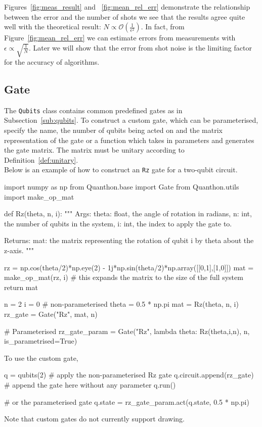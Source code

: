 Figures~\ref{fig:meas_result} and ~\ref{fig:mean_rel_err} demonstrate the relationship between the error and the number of shots we see that the results agree quite well with the theoretical result: $ N \propto \mathcal{O}(\frac{1}{ \epsilon^2 }) $. In fact, from Figure~\ref{fig:mean_rel_err} we can estimate errors from measurements with $ \epsilon \propto \sqrt{\frac{1}{N}} $. Later we will show that the error from shot noise is the limiting factor for the accuracy of algorithms. 


\subsection{Gate}
\label{sub:gate}
The \texttt{Qubits} class contains common predefined gates as in Subsection~\ref{sub:qubits}.
To construct a custom gate, which can be parameterised, specify the name, the number of qubits being acted on and the matrix representation of the gate or a function which takes in parameters and generates the gate matrix. The matrix must be unitary according to Definition~\ref{def:unitary}. \\
Below is an example of how to construct an \texttt{Rz} gate for a two-qubit circuit.
\begin{mycode}
import numpy as np
from Quanthon.base import Gate
from Quanthon.utils import make_op_mat

def Rz(theta, n, i):
	"""
        Args: 
            theta: float, the angle of rotation in radians,
            n: int, the number of qubits in the system,
            i: int, the index to apply the gate to.
        
        Returns:
            mat: the matrix representing the rotation of qubit i by theta about the z-axis.
	"""
    
    rz = np.cos(theta/2)*np.eye(2) - 1j*np.sin(theta/2)*np.array([[0,1],[1,0]])
    mat = make_op_mat(rz, i) # this expands the matrix to the size of the full system
    return mat

n = 2
i = 0
# non-parameterised
theta = 0.5 * np.pi
mat = Rz(theta, n, i)
rz_gate = Gate("Rz", mat, n)

# Parameterised
rz_gate_param = Gate("Rz", lambda theta: Rz(theta,i,n), n, is_parametrised=True)
\end{mycode}

To use the custom gate, 
\begin{mycode}
	q = qubits(2)
	# apply the non-parameterised Rz gate
	q.circuit.append(rz_gate) # append the gate here without any parameter 
	q.run()

	# or the parameterised gate
	q.state = rz_gate_param.act(q.state, 0.5 * np.pi)
	
\end{mycode}
Note that custom gates do not currently support drawing.


